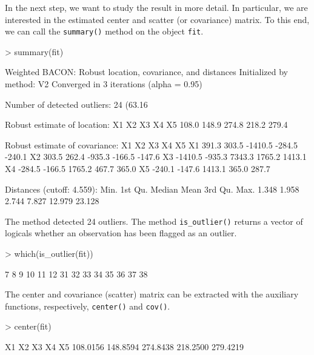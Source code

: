 \documentclass[a4paper,oneside,11pt,DIV=12]{scrartcl}
\newcommand{\code}[1]{{\texttt{#1}}}
\begin{document}
In the next step, we want to study the result in more detail. In particular, we are interested in the estimated center and scatter (or covariance) matrix. To this end, we can call the \code{summary()} method on the object \code{fit}. 
\begin{Schunk}
\begin{Sinput}
> summary(fit)
\end{Sinput}
\begin{Soutput}
Weighted BACON: Robust location, covariance, and distances
Initialized by method: V2 
Converged in 3 iterations (alpha = 0.95)

Number of detected outliers: 24 (63.16%)

Robust estimate of location:
   X1    X2    X3    X4    X5 
108.0 148.9 274.8 218.2 279.4 

Robust estimate of covariance:
        X1     X2      X3     X4     X5
X1   391.3  303.5 -1410.5 -284.5 -240.1
X2   303.5  262.4  -935.3 -166.5 -147.6
X3 -1410.5 -935.3  7343.3 1765.2 1413.1
X4  -284.5 -166.5  1765.2  467.7  365.0
X5  -240.1 -147.6  1413.1  365.0  287.7

Distances (cutoff: 4.559):
   Min. 1st Qu.  Median    Mean 3rd Qu.    Max. 
  1.348   1.958   2.744   7.827  12.979  23.128 
\end{Soutput}
\end{Schunk}

\noindent The method detected 24 outliers. The method \code{is\_outlier()} returns a vector of logicals whether an observation has been flagged as an outlier. 
\begin{Schunk}
\begin{Sinput}
> which(is_outlier(fit))
\end{Sinput}
\begin{Soutput}
 [1]  7  8  9 10 11 12 31 32 33 34 35 36 37 38
\end{Soutput}
\end{Schunk}

\noindent The center and covariance (scatter) matrix can be extracted with the auxiliary functions, respectively, \code{center()} and \code{cov()}.
\begin{Schunk}
\begin{Sinput}
> center(fit)
\end{Sinput}
\begin{Soutput}
      X1       X2       X3       X4       X5 
108.0156 148.8594 274.8438 218.2500 279.4219 
\end{Soutput}
\end{Schunk}
\end{document}
